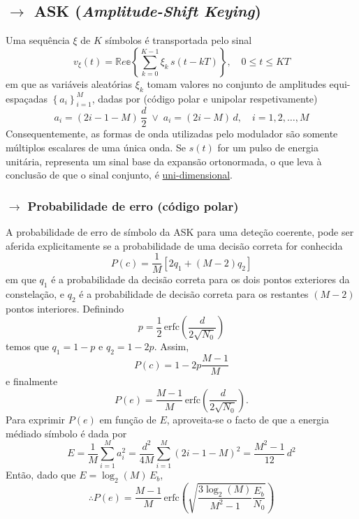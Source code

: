 \subsection[5.1 ASK (\textit{Amplitude-Shift Keying})]{$\rightarrow$ ASK (\textit{Amplitude-Shift Keying})}
\label{subsec:M-ASK}

\begin{mdframed}
Uma sequência $\xi$ de $K$ símbolos é transportada pelo sinal
$$
    v_\xi(t) = \mathbb{R}e\mathbb{e}\left\{ \sum_{k=0}^{K-1} \xi_k\, s(t-kT) \right\},\quad 0 \leq t \leq KT
$$
em que as variáveis aleatórias $\xi_k$ tomam valores no conjunto de amplitudes equi-espaçadas $\left\{ a_i \right\}_{i=1}^{M}$, dadas por (código polar e unipolar respetivamente)
$$
    a_i = (2i - 1 - M)\,\frac{d}{2} \;\lor\; a_i = (2i-M)\,d,\quad i = 1,2,\dots,M
$$
Consequentemente, as formas de onda utilizadas pelo modulador são somente múltiplos escalares de uma única onda. Se $s(t)$ for um pulso de energia unitária, representa um sinal base da expansão ortonormada, o que leva à conclusão de que o sinal conjunto, é \underline{uni-dimensional}.
\end{mdframed}
\subsubsection[5.1.1 Probabilidade de erro (código polar)]{$\rightarrow$ Probabilidade de erro (código polar)}
{\small
A probabilidade de erro de símbolo da ASK para uma deteção coerente, pode ser aferida explicitamente se a probabilidade de uma decisão correta for conhecida
$$
    P(c) = \frac{1}{M}[2q_1 + (M-2)q_2]
$$
em que $q_1$ é a probabilidade da decisão correta para os dois pontos exteriores da constelação, e $q_2$ é a probabilidade de decisão correta para os restantes $(M-2)$ pontos interiores. Definindo
$$
    p = \frac{1}{2}\, \text{erfc}\left(\frac{d}{2\sqrt{N_0}}\right)
$$
temos que $q_1 = 1 - p$ e $q_2 = 1 - 2p$. Assim,
$$
    P(c) = 1 - 2p\frac{M-1}{M}
$$
e finalmente
$$
    P(e) = \frac{M-1}{M}\, \text{erfc}\left(\frac{d}{2\sqrt{N_0}}\right).
$$
Para exprimir $P(e)$ em função de $E$, aproveita-se o facto de que a energia média\footnotemark[4] do símbolo é dada por
$$
    E = \frac{1}{M} \sum_{i=1}^{M} a_i^2 = \frac{d^2}{4M} \sum_{i=1}^{M} (2i - 1 - M)^2 = \frac{M^2-1}{12}\, d^2
$$
Então, dado que $E = \log_2(M)\, E_b$,
$$
    \therefore P(e) = \frac{M-1}{M}\, \text{erfc}\left( \sqrt{\frac{3\log_2(M)}{M^2-1}\frac{E_b}{N_0}} \right)
$$
}
\renewcommand*{\thefootnote}{\fnsymbol{footnote}}
\renewcommand*{\thefootnote}{\arabic{footnote}}


